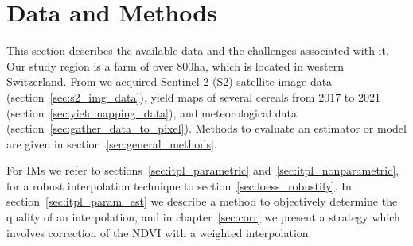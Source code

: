 \chapter{Data and Methods}\label{sec:data_methods}
{
	This section describes the available data and the challenges associated with it.
	Our study region is a farm of over 800ha, which is located in western Switzerland. From \cite{perichPixelbasedCropYield2022}  we acquired Sentinel-2 (S2) satellite image data (section~\ref{sec:s2_img_data}), yield maps of several cereals from 2017 to 2021 (section~\ref{sec:yieldmapping_data}), and meteorological data (section~\ref{sec:gather_data_to_pixel}). Methods to evaluate an estimator or model are given in section~\ref{sec:general_methods}.
	
	For {{IM}}s we refer to sections~\ref{sec:itpl_parametric} and~\ref{sec:itpl_nonparametric}, for a robust interpolation technique to section~\ref{sec:loess_robustify}. In section~\ref{sec:itpl_param_est} we describe a method to objectively determine the quality of an interpolation, and in chapter~\ref{sec:corr} we present a strategy which involves correction of the NDVI with a weighted interpolation.	
}


